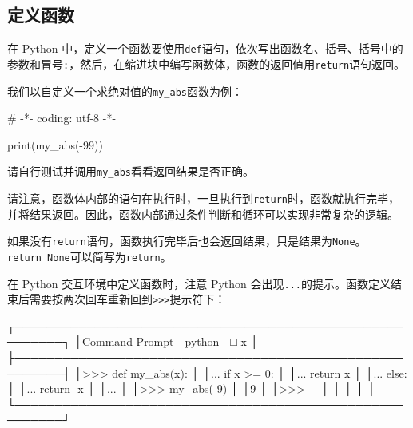 \hypertarget{ux5b9aux4e49ux51fdux6570}{%
\subsection{定义函数}\label{ux5b9aux4e49ux51fdux6570}}

在 Python
中，定义一个函数要使用\texttt{def}语句，依次写出函数名、括号、括号中的参数和冒号\texttt{:}，然后，在缩进块中编写函数体，函数的返回值用\texttt{return}语句返回。

我们以自定义一个求绝对值的\texttt{my\_abs}函数为例：

\begin{pythoncode}
# -*- coding: utf-8 -*-
\end{pythoncode}

\begin{pythoncode}
print(my_abs(-99))
\end{pythoncode}

请自行测试并调用\texttt{my\_abs}看看返回结果是否正确。

请注意，函数体内部的语句在执行时，一旦执行到\texttt{return}时，函数就执行完毕，并将结果返回。因此，函数内部通过条件判断和循环可以实现非常复杂的逻辑。

如果没有\texttt{return}语句，函数执行完毕后也会返回结果，只是结果为\texttt{None}。\texttt{return\ None}可以简写为\texttt{return}。

在 Python 交互环境中定义函数时，注意 Python
会出现\texttt{...}的提示。函数定义结束后需要按两次回车重新回到\texttt{\textgreater{}\textgreater{}\textgreater{}}提示符下：

\begin{pythoncode}
┌────────────────────────────────────────────────────────┐
│Command Prompt - python                           - □ x │
├────────────────────────────────────────────────────────┤
│>>> def my_abs(x):                                      │
│...     if x >= 0:                                      │
│...         return x                                    │
│...     else:                                           │
│...         return -x                                   │
│...                                                     │
│>>> my_abs(-9)                                          │
│9                                                       │
│>>> _                                                   │
│                                                        │
│                                                        │
└────────────────────────────────────────────────────────┘
\end{pythoncode}

